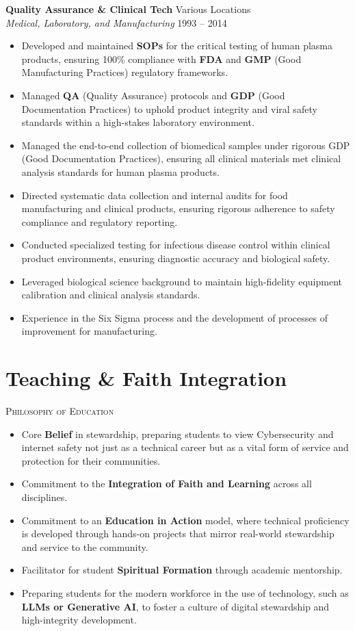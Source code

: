 \documentclass[11pt,letterpaper]{article}
\newcommand{\cvitem}[4]{
    \noindent\textbf{#1} \hfill #2 \\
    \textit{#3} \hfill #4 \par
    \vspace{6pt}
}
\begin{document}
\cvitem{Quality Assurance \& Clinical Tech}{Various Locations}{Medical, Laboratory, and Manufacturing}{1993  --  2014}
\begin{itemize}[noitemsep, topsep=-2pt]
    \item Developed and maintained \textbf{SOPs} for the critical testing of human plasma products, ensuring 100\% compliance with \textbf{FDA} and \textbf{GMP} (Good Manufacturing Practices) regulatory frameworks.
    \item Managed \textbf{QA }(Quality Assurance) protocols and \textbf{GDP} (Good Documentation Practices) to uphold product integrity and viral safety standards within a high-stakes laboratory environment.
    \item Managed the end-to-end collection of biomedical samples under rigorous GDP (Good Documentation Practices), ensuring all clinical materials met clinical analysis standards for human plasma products.
    \item Directed systematic data collection and internal audits for food manufacturing and clinical products, ensuring rigorous adherence to safety compliance and regulatory reporting.
    \item Conducted specialized testing for infectious disease control within clinical product environments, ensuring diagnostic accuracy and biological safety.
    \item Leveraged biological science background to maintain high-fidelity equipment calibration and clinical analysis standards.
    \item Experience in the Six Sigma process and the development of processes of improvement for manufacturing.
\end{itemize}\vspace{5pt}

\section{Teaching \& Faith Integration}
{\small\scshape Philosophy of Education} \par \vspace{2pt}
\begin{itemize}[noitemsep]
    \item Core \textbf{Belief} in stewardship, preparing students to view Cybersecurity and internet safety not just as a technical career but as a vital form of service and protection for their communities.
    \item Commitment to the \textbf{Integration of Faith and Learning} across all disciplines.
    \item Commitment to an \textbf{Education in Action} model, where technical proficiency is developed through hands-on projects that mirror real-world stewardship and service to the community.
    \item Facilitator for student \textbf{Spiritual Formation} through academic mentorship.
    \item Preparing students for the modern workforce in the use of technology, such as \textbf{LLMs or Generative AI}, to foster a culture of digital stewardship and high-integrity development.
\end{itemize}
\end{document}

